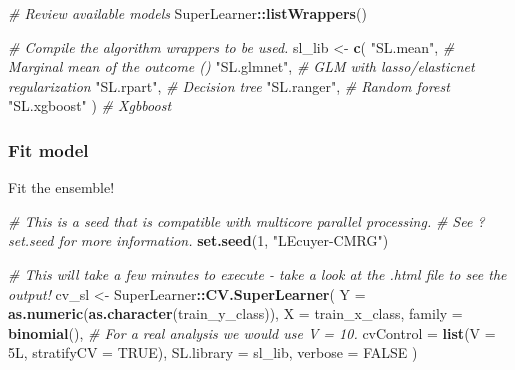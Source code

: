 \documentclass[
]{book}
\newenvironment{Shaded}{\begin{snugshade}}{\end{snugshade}}
\newcommand{\AttributeTok}[1]{\textcolor[rgb]{0.13,0.29,0.53}{#1}}
\newcommand{\CommentTok}[1]{\textcolor[rgb]{0.56,0.35,0.01}{\textit{#1}}}
\newcommand{\ConstantTok}[1]{\textcolor[rgb]{0.56,0.35,0.01}{#1}}
\newcommand{\DataTypeTok}[1]{\textcolor[rgb]{0.13,0.29,0.53}{#1}}
\newcommand{\DecValTok}[1]{\textcolor[rgb]{0.00,0.00,0.81}{#1}}
\newcommand{\FunctionTok}[1]{\textcolor[rgb]{0.13,0.29,0.53}{\textbf{#1}}}
\newcommand{\NormalTok}[1]{#1}
\newcommand{\OtherTok}[1]{\textcolor[rgb]{0.56,0.35,0.01}{#1}}
\newcommand{\SpecialCharTok}[1]{\textcolor[rgb]{0.81,0.36,0.00}{\textbf{#1}}}
\newcommand{\StringTok}[1]{\textcolor[rgb]{0.31,0.60,0.02}{#1}}
\begin{document}
\begin{Shaded}
\begin{Highlighting}[]
\CommentTok{\# Review available models}
\NormalTok{SuperLearner}\SpecialCharTok{::}\FunctionTok{listWrappers}\NormalTok{()}
\end{Highlighting}
\end{Shaded}

\begin{Shaded}
\begin{Highlighting}[]
\CommentTok{\# Compile the algorithm wrappers to be used.}
\NormalTok{sl\_lib }\OtherTok{\textless{}{-}} \FunctionTok{c}\NormalTok{(}
  \StringTok{"SL.mean"}\NormalTok{, }\CommentTok{\# Marginal mean of the outcome ()}
  \StringTok{"SL.glmnet"}\NormalTok{, }\CommentTok{\# GLM with lasso/elasticnet regularization}
  \StringTok{"SL.rpart"}\NormalTok{, }\CommentTok{\# Decision tree}
  \StringTok{"SL.ranger"}\NormalTok{, }\CommentTok{\# Random forest}
  \StringTok{"SL.xgboost"}
\NormalTok{) }\CommentTok{\# Xgbboost}
\end{Highlighting}
\end{Shaded}

\subsubsection{Fit model}\label{fit-model}

Fit the ensemble!

\begin{Shaded}
\begin{Highlighting}[]
\CommentTok{\# This is a seed that is compatible with multicore parallel processing.}
\CommentTok{\# See ?set.seed for more information.}
\FunctionTok{set.seed}\NormalTok{(}\DecValTok{1}\NormalTok{, }\StringTok{"L\textquotesingle{}Ecuyer{-}CMRG"}\NormalTok{)}

\CommentTok{\# This will take a few minutes to execute {-} take a look at the .html file to see the output!}
\NormalTok{cv\_sl }\OtherTok{\textless{}{-}}\NormalTok{ SuperLearner}\SpecialCharTok{::}\FunctionTok{CV.SuperLearner}\NormalTok{(}
  \AttributeTok{Y =} \FunctionTok{as.numeric}\NormalTok{(}\FunctionTok{as.character}\NormalTok{(train\_y\_class)),}
  \AttributeTok{X =}\NormalTok{ train\_x\_class,}
  \AttributeTok{family =} \FunctionTok{binomial}\NormalTok{(),}
  \CommentTok{\# For a real analysis we would use V = 10.}
  \AttributeTok{cvControl =} \FunctionTok{list}\NormalTok{(}\AttributeTok{V =} \DecValTok{5}\DataTypeTok{L}\NormalTok{, }\AttributeTok{stratifyCV =} \ConstantTok{TRUE}\NormalTok{),}
  \AttributeTok{SL.library =}\NormalTok{ sl\_lib,}
  \AttributeTok{verbose =} \ConstantTok{FALSE}
\NormalTok{)}
\end{Highlighting}
\end{Shaded}
\end{document}
